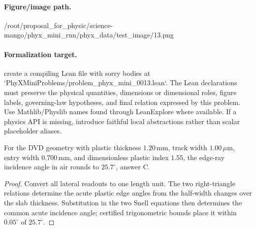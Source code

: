 \paragraph{Figure/image path.}
/root/proposal\_for\_physic/science-mango/phyx\_mini\_run/phyx\_data/test\_image/13.png

\paragraph{Formalization target.}
create a compiling Lean file with sorry bodies at `PhyXMiniProblems/problem\_phyx\_mini\_0013.lean`. The Lean declarations must preserve the physical quantities, dimensions or dimensional roles, figure labels, governing-law hypotheses, and final relation expressed by this problem.
Use Mathlib/Physlib names found through LeanExplore where available. If a physics API is missing, introduce faithful local abstractions rather than scalar placeholder aliases.

\begin{theorem}
\label{thm:physics:phyx_mini_0013:target}
For the DVD geometry with plastic thickness \(1.20\,\mathrm{mm}\), track
width \(1.00\,\mu\mathrm m\), entry width \(0.700\,\mathrm{mm}\), and
dimensionless plastic index \(1.55\), the edge-ray incidence angle in air
rounds to \(25.7^\circ\), answer C.
\end{theorem}
\begin{proof}
Convert all lateral readouts to one length unit.  The two right-triangle
relations determine the acute plastic edge angles from the half-width changes
over the slab thickness.  Substitution in the two Snell equations then
determines the common acute incidence angle; certified trigonometric bounds
place it within \(0.05^\circ\) of \(25.7^\circ\).
\end{proof}

